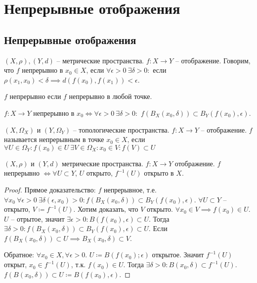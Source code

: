 \documentclass[main]{subfiles}
\begin{document}
\chapter{Непрерывные отображения}
\section{Непрерывные отображения}
\begin{definition}
    $(X, \rho), (Y, d)$ -- метрические пространства. $f: X \to Y$ -- отображение.
    Говорим, что $f$ непрерывно в $x_0 \in X$, если
    $\forall \epsilon > 0\ \exists \delta > 0:$ если $\rho(x_1, x_0) < \delta \implies d(f(x_0), f(x_1)) < \epsilon$.
\end{definition}
\begin{definition}
    $f$ непрерывно если $f$ непрерывно в любой точке.
\end{definition}
\begin{remark}
    $f: X \to Y$ непрерывно в $x_0 \Leftrightarrow \forall \epsilon > 0\ \exists \delta > 0:$
    $f\left(B_X(x_0, \delta)\right) \subset B_Y(f(x_0), \epsilon)$.
\end{remark}

\begin{definition}
    $(X, \Omega_X)$ и $(Y, \Omega_Y)$ -- топологические пространства.
    $f: X \to Y$ -- отображение.
    $f$ называется непрерывным в точке $x_0 \in X$, если $\forall U \in \Omega_Y : f(x_0) \in U\ \exists V \in \Omega_X: x_0 \in V: f(V) \subset U $
\end{definition}

\begin{theorem}
    $(X, \rho)$ и $(Y, d)$ метрические пространства. $f: X \to Y$ отображение.
    $f$ непрерывно $\Leftrightarrow \forall U \subset Y$, $U$ открыто, $f^{-1}(U)$ открыто в $X$.
\end{theorem}
\begin{proof}
    Прямое доказательство: $f$ непрерывное, т.е.
    $\forall x_0\ \forall \epsilon > 0\ \exists \delta(\epsilon, x_0) > 0: f(B_X(x_0, \delta))\subset B_Y (f(x_0), \epsilon)$.
    $\forall U \subset Y$ -- открыто, $V \coloneqq f^{-1}(U)$.
    Хотим доказать, что $V$ открыто. $\forall x_0 \in V \implies f(x_0) \in U$.
    $U$ -- отрытое, значит $\exists \epsilon > 0: B(f(x_0), \epsilon) \subset U$.
    Тогда $\exists \delta > 0: f(B_X(x_0, \delta)) \subset B_Y(f(x_0), \epsilon) \subset U$.
    Если $f(B_X(x_0, \delta)) \subset U \implies B_X(x_0, \delta) \subset V$.

    Обратное: $\forall x_0 \in X, \forall\epsilon >0.$ $U\coloneqq B(f(x_0); \epsilon)$ открытое.
    Значит $f^{-1}(U)$ открыт, $x_0 \in f^{-1}(U)$, т.к. $f(x_0) \in U$.
    Тогда $\exists \delta > 0: B(x_0, \delta) \subset f^{-1}(U)$.
    $f(B(x_0, \delta)) \subset U \coloneqq B(f(x_0), \epsilon)$.
\end{proof}
\end{document}
